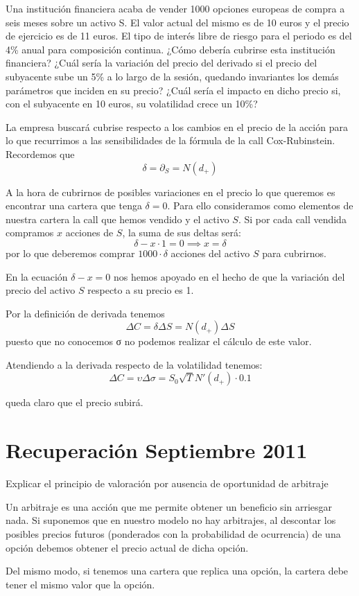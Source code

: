 \begin{problem}[4]
Una institución financiera acaba de vender 1000 opciones europeas de compra a seis meses sobre
un activo S. El valor actual del mismo es de 10 euros y el precio de ejercicio es de 11 euros. El tipo
de interés libre de riesgo para el periodo es del 4\% anual para composición continua.
\ppart ¿Cómo debería cubrirse esta institución financiera?
\ppart ¿Cuál sería la variación del precio del derivado si el precio del subyacente sube un 5\% a lo largo de la sesión, quedando invariantes los demás parámetros que inciden en su precio?
\ppart ¿Cuál sería el impacto en dicho precio si, con el subyacente en 10 euros, su volatilidad crece un 10\%?

\solution
{}

\spart

La empresa buscará cubrise respecto a los cambios en el precio de la acción para lo que recurrimos a las sensibilidades de la fórmula de la call Cox-Rubinstein. Recordemos que
\[δ = \partial_S = N(d_+)\]

A la hora de cubrirnos de posibles variaciones en el precio lo que queremos es encontrar una cartera que tenga $δ=0$. Para ello consideramos como elementos de nuestra cartera la call que hemos vendido y el activo $S$. Si por cada call vendida compramos $x$ acciones de $S$, la suma de sus deltas será:
\[δ - x\cdot 1 = 0 \implies x = δ\]
por lo que deberemos comprar $1000\cdot δ$ acciones del activo $S$ para cubrirnos.

\obs En la ecuación $δ-x=0$ nos hemos apoyado en el hecho de que la variación del precio del activo $S$ respecto a su precio es 1.

\spart

Por la definición de derivada tenemos
\[ΔC = δΔS = N(d_+)ΔS \]
puesto que no conocemos σ no podemos realizar el cálculo de este valor.

\spart

Atendiendo a la derivada respecto de la volatilidad tenemos:
\[ΔC = \upsilon Δσ = S_0\sqrt{T}N'(d_+)\cdot 0.1\]

queda claro que el precio subirá.

\end{problem}

\section{Recuperación Septiembre 2011}
\begin{problem}[1]
Explicar el principio de valoración por ausencia de oportunidad de arbitraje
\solution


Un arbitraje es una acción que me permite obtener un beneficio sin arriesgar nada. Si suponemos que en nuestro modelo no hay arbitrajes, al descontar los posibles precios futuros (ponderados con la probabilidad de ocurrencia) de una opción debemos obtener el precio actual de dicha opción.

Del mismo modo, si tenemos una cartera que replica una opción, la cartera debe tener el mismo valor que la opción.
\end{problem}


